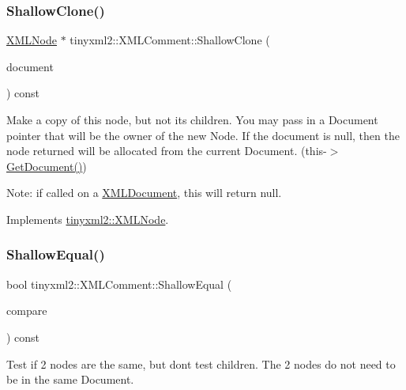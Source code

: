 \subsubsection{\texorpdfstring{Shallow\+Clone()}{ShallowClone()}}
{\footnotesize\ttfamily \mbox{\hyperlink{classtinyxml2_1_1_x_m_l_node}{X\+M\+L\+Node}} $\ast$ tinyxml2\+::\+X\+M\+L\+Comment\+::\+Shallow\+Clone (\begin{DoxyParamCaption}\item[{\mbox{\hyperlink{classtinyxml2_1_1_x_m_l_document}{X\+M\+L\+Document}} $\ast$}]{document }\end{DoxyParamCaption}) const\hspace{0.3cm}{\ttfamily [virtual]}}

Make a copy of this node, but not its children. You may pass in a Document pointer that will be the owner of the new Node. If the \textquotesingle{}document\textquotesingle{} is null, then the node returned will be allocated from the current Document. (this-\/$>$\mbox{\hyperlink{classtinyxml2_1_1_x_m_l_node_af343d1ef0b45c0020e62d784d7e67a68}{Get\+Document()}})

Note\+: if called on a \mbox{\hyperlink{classtinyxml2_1_1_x_m_l_document}{X\+M\+L\+Document}}, this will return null. 

Implements \mbox{\hyperlink{classtinyxml2_1_1_x_m_l_node_a8402cbd3129d20e9e6024bbcc0531283}{tinyxml2\+::\+X\+M\+L\+Node}}.

\mbox{\label{classtinyxml2_1_1_x_m_l_comment_a965d880a99d58dd915caa88dc37a9b51}} 
\subsubsection{\texorpdfstring{Shallow\+Equal()}{ShallowEqual()}}
{\footnotesize\ttfamily bool tinyxml2\+::\+X\+M\+L\+Comment\+::\+Shallow\+Equal (\begin{DoxyParamCaption}\item[{const \mbox{\hyperlink{classtinyxml2_1_1_x_m_l_node}{X\+M\+L\+Node}} $\ast$}]{compare }\end{DoxyParamCaption}) const\hspace{0.3cm}{\ttfamily [virtual]}}

Test if 2 nodes are the same, but don\textquotesingle{}t test children. The 2 nodes do not need to be in the same Document.

